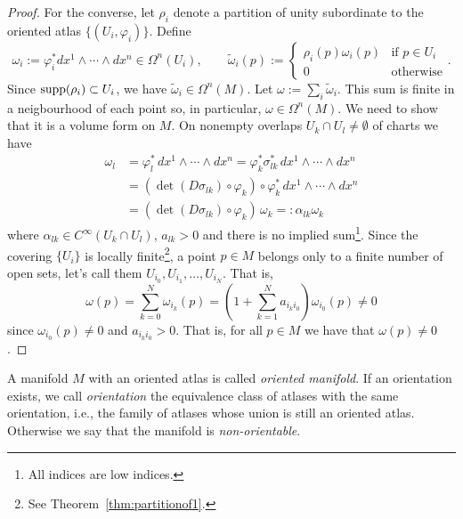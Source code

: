 \begin{proof}
  For the converse, let $\rho_i$ denote a partition of unity subordinate to the oriented atlas $\{(U_i, \varphi_i)\}$.
  Define
  \begin{equation}
    \omega_i := \varphi_i^* dx^1\wedge\cdots\wedge dx^n \in \Omega^n(U_i)
    , \qquad
    \widetilde \omega_i(p) := \begin{cases}
      \rho_i(p)\omega_i(p) & \mbox{if } p\in U_i \\
      0                    & \mbox{otherwise}
    \end{cases}.
  \end{equation}
  Since $\operatorname{supp}(\rho_i) \subset U_i$, we have $\widetilde\omega_i\in\Omega^n(M)$.
  Let $\omega := \sum_i \widetilde \omega_i$. This sum is finite in a neigbourhood of each point so, in particular, $\omega \in \Omega^n(M)$. We need to show that it is a volume form on $M$.
  On nonempty overlaps $U_k \cap U_l \neq \emptyset$ of charts we have
  \begin{align}
    \omega_l & = \varphi_l^*\, dx^1\wedge\cdots\wedge dx^n = \varphi_k^* \sigma_{lk}^*\, dx^1 \wedge\cdots\wedge dx^n \\
             & = (\det(D\sigma_{lk})\circ \varphi_k)\circ \varphi^*_k\, dx^1\wedge\cdots\wedge dx^n                   \\
             & = (\det(D\sigma_{lk})\circ \varphi_k)\, \omega_k =: \alpha_{lk} \omega_k \label{form:cov}
  \end{align}
  where $\alpha_{lk}\in C^{\infty}(U_k\cap U_l)$, $a_{lk} > 0$ and there is no implied sum\footnote{All indices are low indices.}.
  Since the covering $\{U_i\}$ is locally finite\footnote{See Theorem~\ref{thm:partitionof1}.}, a point $p\in M$ belongs only to a finite number of open sets, let's call them $U_{i_0}, U_{i_1}, \ldots, U_{i_N}$. That is,
  \begin{equation}
    \omega(p) = \sum_{k=0}^N \omega_{i_k}(p) = \left( 1 + \sum_{k = 1}^N a_{i_k i_0} \right) \omega_{i_0}(p) \neq 0
  \end{equation}
  since $\omega_{i_0}(p) \neq 0$ and $a_{i_k i_0} > 0$.
  That is, for all $p\in M$ we have that $\omega(p) \neq 0$.
\end{proof}


\begin{definition}
  A manifold $M$ with an oriented atlas is called \emph{oriented manifold}.
  If an orientation exists, we call \emph{orientation} the equivalence class of atlases with the same orientation, i.e., the family of atlases whose union is still an oriented atlas.
  Otherwise we say that the manifold is \emph{non-orientable}.
\end{definition}

